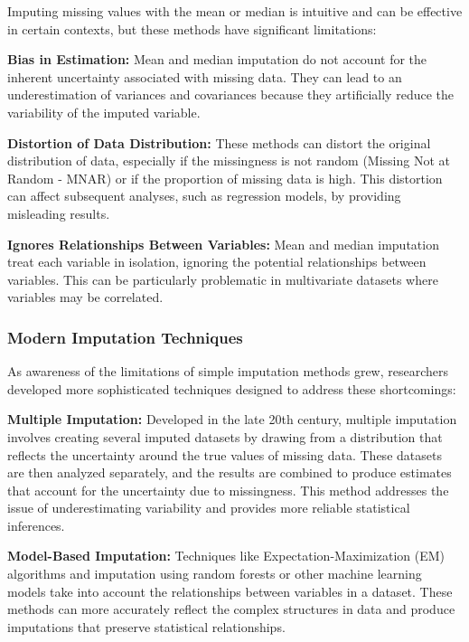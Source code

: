 \documentclass[
]{book}
\begin{document}
Imputing missing values with the mean or median is intuitive and can be
effective in certain contexts, but these methods have significant
limitations:

\textbf{Bias in Estimation:} Mean and median imputation do not account for
the inherent uncertainty associated with missing data. They can lead to
an underestimation of variances and covariances because they
artificially reduce the variability of the imputed variable.

\textbf{Distortion of Data Distribution:} These methods can distort the
original distribution of data, especially if the missingness is not
random (Missing Not at Random - MNAR) or if the proportion of missing
data is high. This distortion can affect subsequent analyses, such as
regression models, by providing misleading results.

\textbf{Ignores Relationships Between Variables:} Mean and median imputation
treat each variable in isolation, ignoring the potential relationships
between variables. This can be particularly problematic in multivariate
datasets where variables may be correlated.

\subsubsection*{Modern Imputation Techniques}\label{modern-imputation-techniques}

As awareness of the limitations of simple imputation methods grew,
researchers developed more sophisticated techniques designed to address
these shortcomings:

\textbf{Multiple Imputation:} Developed in the late 20th century, multiple
imputation involves creating several imputed datasets by drawing from a
distribution that reflects the uncertainty around the true values of
missing data. These datasets are then analyzed separately, and the
results are combined to produce estimates that account for the
uncertainty due to missingness. This method addresses the issue of
underestimating variability and provides more reliable statistical
inferences.

\textbf{Model-Based Imputation:} Techniques like Expectation-Maximization
(EM) algorithms and imputation using random forests or other machine
learning models take into account the relationships between variables in
a dataset. These methods can more accurately reflect the complex
structures in data and produce imputations that preserve statistical
relationships.
\end{document}
